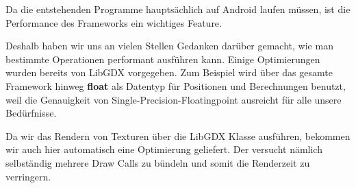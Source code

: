 Da die entstehenden Programme hauptsächlich auf Android laufen müssen, ist die Performance des Frameworks ein wichtiges Feature.

Deshalb haben wir uns an vielen Stellen Gedanken darüber gemacht, wie man bestimmte Operationen performant ausführen kann. Einige Optimierungen wurden bereits von LibGDX vorgegeben. Zum Beispiel wird über das gesamte Framework hinweg \textbf{float} als Datentyp für Positionen und Berechnungen benutzt, weil die Genauigkeit von Single-Precision-Floatingpoint ausreicht für alle unsere Bedürfnisse.

Da wir das Rendern von Texturen über die LibGDX Klasse  ausführen, bekommen wir auch hier automatisch eine Optimierung geliefert. Der  versucht nämlich selbständig mehrere Draw Calls zu bündeln und somit die Renderzeit zu verringern.

